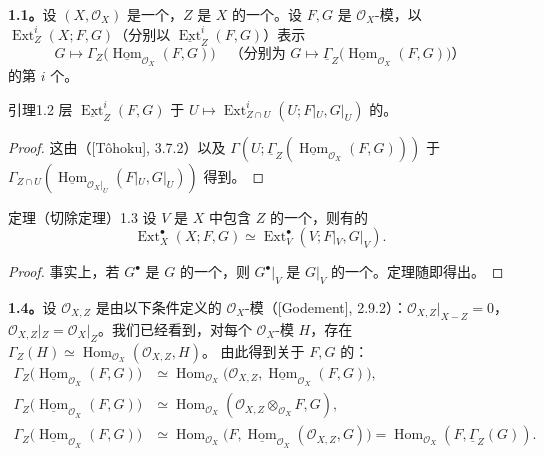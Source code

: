 \textbf{1.1。}设 $(X,\mathscr O_X)$ 是一个，$Z$ 是 $X$ 的一个。设 $F,G$ 是 $\mathscr O_X$-模，以 $\operatorname{Ext}^i_Z(X;F,G)$（分别以 $\underline{\operatorname{Ext}}^i_Z(F,G)$）表示
\[
 G\longmapsto\Gamma_Z\bigl(\underline{\operatorname{Hom}}_{\mathscr O_X}(F,G)\bigr)
 \quad\text{（分别为 }G\longmapsto\underline\Gamma_Z\bigl(\underline{\operatorname{Hom}}_{\mathscr O_X}(F,G)\bigr)\text{）}
\]
的第 $i$ 个。
\begin{SGAresult}{引理}{1.2}
层 $\underline{\operatorname{Ext}}^i_Z(F,G)$ 于
$U\mapsto\operatorname{Ext}^i_{Z\cap U}(U;F|_U,G|_U)$ 的。
\end{SGAresult}
\begin{proof}
这由（[Tôhoku], 3.7.2）以及 $\Gamma(U;\underline\Gamma_Z(\underline{\operatorname{Hom}}_{\mathscr O_X}(F,G)))$ 于 $\Gamma_{Z\cap U}(\underline{\operatorname{Hom}}_{\mathscr O_X|_U}(F|_U,G|_U))$ 得到。
\end{proof}
\begin{SGAresult}{定理（切除定理）}{1.3}
设 $V$ 是 $X$ 中包含 $Z$ 的一个，则有的
\[
 \operatorname{Ext}^{\bullet}_X(X;F,G)\simeq
 \operatorname{Ext}^{\bullet}_V(V;F|_V,G|_V).\tag{1.3.1}
\]
\end{SGAresult}
\begin{proof}
事实上，若 $G^{\bullet}$ 是 $G$ 的一个，则 $G^{\bullet}|_V$ 是 $G|_V$ 的一个。定理随即得出。
\end{proof}
\textbf{1.4。}设 $\mathscr O_{X,Z}$ 是由以下条件定义的 $\mathscr O_X$-模（[Godement], 2.9.2）：$\mathscr O_{X,Z}|_{X-Z}=0$，$\mathscr O_{X,Z}|_Z=\mathscr O_X|_Z$。我们已经看到，对每个 $\mathscr O_X$-模 $H$，存在
$\Gamma_Z(H)\simeq\operatorname{Hom}_{\mathscr O_X}(\mathscr O_{X,Z},H)$。
由此得到关于 $F,G$ 的：
\begin{align}
\Gamma_Z\bigl(\underline{\operatorname{Hom}}_{\mathscr O_X}(F,G)\bigr)
&\simeq\operatorname{Hom}_{\mathscr O_X}\bigl(\mathscr O_{X,Z},\underline{\operatorname{Hom}}_{\mathscr O_X}(F,G)\bigr),\tag{1.4.1}\\
\Gamma_Z\bigl(\underline{\operatorname{Hom}}_{\mathscr O_X}(F,G)\bigr)
&\simeq\operatorname{Hom}_{\mathscr O_X}(\mathscr O_{X,Z}\otimes_{\mathscr O_X}F,G),\tag{1.4.2}\\
\Gamma_Z\bigl(\underline{\operatorname{Hom}}_{\mathscr O_X}(F,G)\bigr)
&\simeq\operatorname{Hom}_{\mathscr O_X}\bigl(F,\underline{\operatorname{Hom}}_{\mathscr O_X}(\mathscr O_{X,Z},G)\bigr)
 =\operatorname{Hom}_{\mathscr O_X}(F,\underline\Gamma_Z(G)).\tag{1.4.3}
\end{align}
